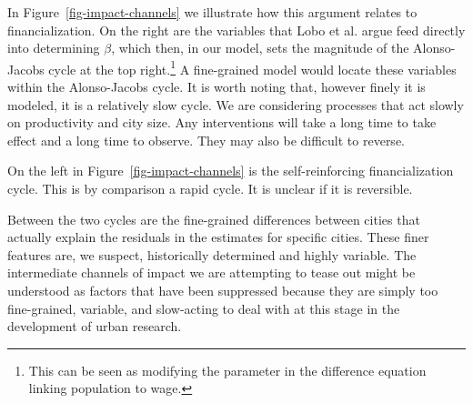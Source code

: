 \documentclass[a4paper]{article}
\theoremstyle{definition}
\theoremstyle{plain}
\begin{document}
{In Figure~\ref{fig-impact-channels} we illustrate how this argument relates to financialization. On the right are the variables that Lobo et al. \cite{loboUrbanScalingProduction2013} argue feed directly into determining $\beta$, which then, in our model, sets the magnitude of the %
{Alonso-Jacobs cycle} at the top right.\footnote{This can be seen as modifying the parameter in the difference equation linking population to wage.} A fine-grained model would locate these variables within the Alonso-Jacobs cycle. It is worth noting that, however finely it is modeled, it is a relatively slow cycle. We are considering processes that act slowly on productivity and city size. Any interventions will take a long time to take effect and a long time to observe. They may also be difficult to reverse. 


 
On the left in Figure~\ref{fig-impact-channels} is the self-reinforcing %
financialization cycle. This is by comparison a rapid cycle. It is unclear if it is reversible. 
 
Between the two cycles are the fine-grained differences between cities that actually explain the residuals in the estimates for specific cities. These finer features are, we suspect, historically determined and highly variable. The intermediate channels of impact we are attempting to tease out %
might be understood as factors that have been suppressed because they are simply too fine-grained, variable, and slow-acting  to deal with at this stage in the development of urban research.









}
\end{document}
